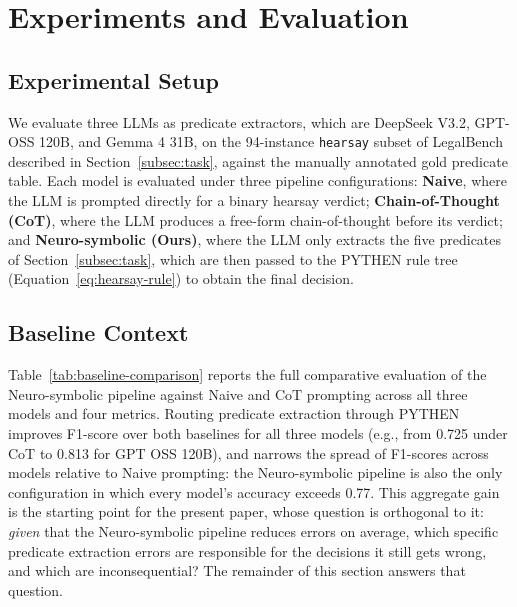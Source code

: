 \section{Experiments and Evaluation}
\label{sec:experiments}

\subsection{Experimental Setup}
\label{subsec:setup}
We evaluate three LLMs as predicate extractors, which are DeepSeek V3.2, GPT-OSS 120B, and Gemma 4 31B, on the 94-instance \texttt{hearsay} subset of LegalBench described in Section~\ref{subsec:task}, against the manually annotated gold predicate table. Each model is evaluated under three pipeline configurations: \textbf{Naive}, where the LLM is prompted directly for a binary hearsay verdict; \textbf{Chain-of-Thought (CoT)}, where the LLM produces a free-form chain-of-thought before its verdict; and \textbf{Neuro-symbolic (Ours)}, where the LLM only extracts the five predicates of Section~\ref{subsec:task}, which are then passed to the PYTHEN rule tree (Equation~\ref{eq:hearsay-rule}) to obtain the final decision.

\subsection{Baseline Context}
\label{subsec:overall}
Table~\ref{tab:baseline-comparison} reports the full comparative evaluation of the Neuro-symbolic pipeline against Naive and CoT prompting across all three models and four metrics. Routing predicate extraction through PYTHEN improves F1-score over both baselines for all three models (e.g., from 0.725 under CoT to 0.813 for GPT OSS 120B), and narrows the spread of F1-scores across models relative to Naive prompting: the Neuro-symbolic pipeline is also the only configuration in which every model's accuracy exceeds 0.77. This aggregate gain is the starting point for the present paper, whose question is orthogonal to it: \emph{given} that the Neuro-symbolic pipeline reduces errors on average, which specific predicate extraction errors are responsible for the decisions it still gets wrong, and which are inconsequential? The remainder of this section answers that question.


